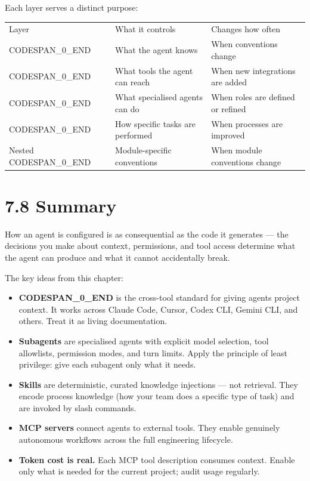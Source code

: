\documentclass[11pt,a4paper]{book}
\begin{document}
Each layer serves a distinct purpose:

\begin{tabular}{lll}
\hline
Layer & What it controls & Changes how often \\
CODESPAN\_0\_END & What the agent knows & When conventions change \\
CODESPAN\_0\_END & What tools the agent can reach & When new integrations are added \\
CODESPAN\_0\_END & What specialised agents can do & When roles are defined or refined \\
CODESPAN\_0\_END & How specific tasks are performed & When processes are improved \\
Nested CODESPAN\_0\_END & Module-specific conventions & When module conventions change \\
\hline
\end{tabular}

\medskip

\section{7.8 Summary}

How an agent is configured is as consequential as the code it generates --- the decisions you make about context, permissions, and tool access determine what the agent can produce and what it cannot accidentally break.

The key ideas from this chapter:

\begin{itemize}
  \item \textbf{CODESPAN\_0\_END} is the cross-tool standard for giving agents project context. It works across Claude Code, Cursor, Codex CLI, Gemini CLI, and others. Treat it as living documentation.
  \item \textbf{Subagents} are specialised agents with explicit model selection, tool allowlists, permission modes, and turn limits. Apply the principle of least privilege: give each subagent only what it needs.
  \item \textbf{Skills} are deterministic, curated knowledge injections --- not retrieval. They encode process knowledge (how your team does a specific type of task) and are invoked by slash commands.
  \item \textbf{MCP servers} connect agents to external tools. They enable genuinely autonomous workflows across the full engineering lifecycle.
  \item \textbf{Token cost is real.} Each MCP tool description consumes context. Enable only what is needed for the current project; audit usage regularly.
\end{itemize}
\end{document}
